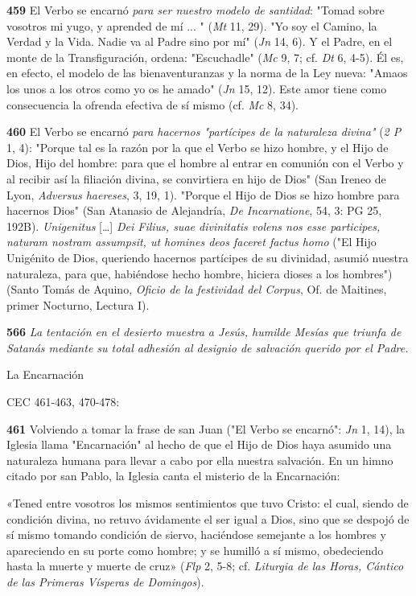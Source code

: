 \documentclass[]{article}
\begin{document}
\textbf{459} El Verbo se encarnó \emph{para ser nuestro modelo de
santidad}: "Tomad sobre vosotros mi yugo, y aprended de mí ... "
(\emph{Mt} 11, 29). "Yo soy el Camino, la Verdad y la Vida. Nadie va al
Padre sino por mí" (\emph{Jn} 14, 6). Y el Padre, en el monte de la
Transfiguración, ordena: "Escuchadle" (\emph{Mc} 9, 7; cf. \emph{Dt} 6,
4-5). Él es, en efecto, el modelo de las bienaventuranzas y la norma de
la Ley nueva: "Amaos los unos a los otros como yo os he amado"
(\emph{Jn} 15, 12). Este amor tiene como consecuencia la ofrenda
efectiva de sí mismo (cf. \emph{Mc} 8, 34).

\textbf{460} El Verbo se encarnó \emph{para hacernos "partícipes de la
naturaleza divina"} (\emph{2 P} 1, 4): "Porque tal es la razón por la
que el Verbo se hizo hombre, y el Hijo de Dios, Hijo del hombre: para
que el hombre al entrar en comunión con el Verbo y al recibir así la
filiación divina, se convirtiera en hijo de Dios" (San Ireneo de Lyon,
\emph{Adversus haereses}, 3, 19, 1). "Porque el Hijo de Dios se hizo
hombre para hacernos Dios" (San Atanasio de Alejandría, \emph{De
Incarnatione}, 54, 3: PG 25, 192B). \emph{Unigenitus} [\ldots{}]
\emph{Dei Filius, suae divinitatis volens nos esse participes, naturam
nostram assumpsit, ut homines deos faceret factus homo} ("El Hijo
Unigénito de Dios, queriendo hacernos partícipes de su divinidad, asumió
nuestra naturaleza, para que, habiéndose hecho hombre, hiciera dioses a
los hombres") (Santo Tomás de Aquino, \emph{Oficio de la festividad del
Corpus}, Of. de Maitines, primer Nocturno, Lectura I).

\textbf{566} \emph{La tentación en el desierto muestra a Jesús, humilde
Mesías que triunfa de Satanás mediante su total adhesión al designio de
salvación querido por el Padre.}

La Encarnación

CEC 461-463, 470-478:

\textbf{461} Volviendo a tomar la frase de san Juan ("El Verbo se
encarnó": \emph{Jn} 1, 14), la Iglesia llama "Encarnación" al hecho de
que el Hijo de Dios haya asumido una naturaleza humana para llevar a
cabo por ella nuestra salvación. En un himno citado por san Pablo, la
Iglesia canta el misterio de la Encarnación:

«Tened entre vosotros los mismos sentimientos que tuvo Cristo: el cual,
siendo de condición divina, no retuvo ávidamente el ser igual a Dios,
sino que se despojó de sí mismo tomando condición de siervo, haciéndose
semejante a los hombres y apareciendo en su porte como hombre; y se
humilló a sí mismo, obedeciendo hasta la muerte y muerte de cruz»
(\emph{Flp} 2, 5-8; cf. \emph{Liturgia de las Horas, Cántico de las
Primeras Vísperas de Domingos}).
\end{document}
